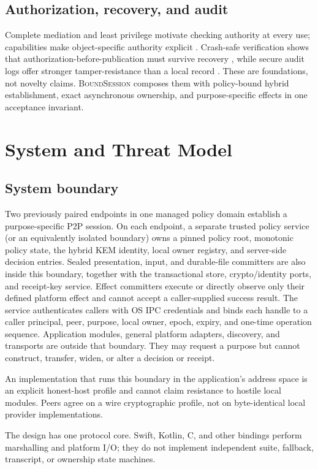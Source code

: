 \documentclass[journal]{IEEEtran}
\newcommand{\system}{\textsc{BoundSession}}
\begin{document}
\subsection{Authorization, recovery, and audit}
Complete mediation and least privilege motivate checking authority at every
use; capabilities make object-specific authority explicit
\cite{saltzer1975,miller2003}. Crash-safe verification shows that
authorization-before-publication must survive recovery \cite{fscq2015}, while
secure audit logs offer stronger tamper-resistance than a local record
\cite{schneier1999}. These are foundations, not novelty claims. \system{}
composes them with policy-bound hybrid establishment, exact asynchronous
ownership, and purpose-specific effects in one acceptance invariant.

\section{System and Threat Model}

\subsection{System boundary}
Two previously paired endpoints in one managed policy domain establish a
purpose-specific P2P session. On each endpoint, a separate trusted policy
service (or an equivalently isolated boundary) owns a pinned policy root,
monotonic policy state, the hybrid KEM identity, local owner registry, and
server-side decision entries. Sealed presentation, input, and durable-file
committers are also inside this boundary, together with the transactional store, crypto/identity
ports, and receipt-key service. Effect committers execute or directly observe
only their defined platform effect and cannot accept a caller-supplied success
result. The service authenticates callers with OS IPC credentials
and binds each handle to a caller principal, peer, purpose, local owner, epoch,
expiry, and one-time operation sequence. Application modules, general platform
adapters, discovery, and transports are outside that boundary. They may request
a purpose but cannot construct, transfer, widen, or alter a decision or receipt.

An implementation that runs this boundary in the application's address space is
an explicit honest-host profile and cannot claim resistance to hostile local
modules. Peers agree on a wire cryptographic profile, not on byte-identical local
provider implementations.

The design has one protocol core. Swift, Kotlin, C, and other bindings perform
marshalling and platform I/O; they do not implement independent suite,
fallback, transcript, or ownership state machines.
\end{document}
